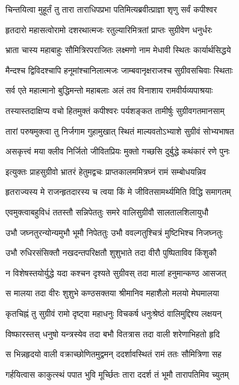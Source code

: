 \twolineshloka
{चिन्तयित्वा मुहूर्तं तु तारा ताराधिपप्रभा}
{पतिमित्यब्रवीत्प्राज्ञा शृणु सर्वं कपीश्वर}


\twolineshloka
{हृतदारो महासत्वोरामो दशरथात्मजः}
{रतुल्यारिमित्रतां प्राप्तः सुग्रीवेण धनुर्धरः}


\twolineshloka
{भ्राता चास्य महाबाहुः सौमित्रिरपराजितः}
{लक्ष्मणो नाम मेधावी स्थितः कार्यार्थसिद्धये}


\twolineshloka
{मैन्दश्च द्विविदश्चापि हनूमांश्चानिलात्मजः}
{जाम्बवानृक्षराजश्च सुग्रीवसचिवाः स्थिताः}


\twolineshloka
{सर्व एते महात्मानो बुद्धिमन्तो महाबलाः}
{अलं तव विनाशाय रामवीर्यव्यपाश्रयाः}


\twolineshloka
{तस्यास्तदाक्षिप्य वचो हितमुक्तं कपीश्वरः}
{पर्यशङ्कत तामीर्षुः सुग्रीवगतमानसाम्}


\twolineshloka
{तारां परुषमुक्त्वा तु निर्जगाम गुहामुखात्}
{स्थितं माल्यवतोऽभ्याशे सुग्रीवं सोभ्यभाषत}


\twolineshloka
{असकृत्त्वं मया क्लीव निर्जितो जीवितप्रियः}
{मुक्तो गच्छसि दुर्बुद्धे कथंकारं रणे पुनः}


\twolineshloka
{इत्युक्तः प्राहसुग्रीवो भ्रातरं हेतुमद्वचः}
{प्राप्तकालममित्रघ्नं रामं सम्बोधयन्निव}


\twolineshloka
{हृतराज्यस्य मे राजन्हृतदारस्य च त्वया}
{किं मे जीवितसामर्थ्यमिति विद्धि समागतम्}


\twolineshloka
{एवमुक्त्वाबहुविधं ततस्तौ सन्निपेततुः}
{समरे वालिसुग्रीवौ सालतालशिलायुधौ}


\twolineshloka
{उभौ जघ्नतुरन्योन्यमुभौ भूमौ निपेततुः}
{उभौ ववल्गतुश्चित्रं मुष्टिभिश्च निजघ्नतुः}


\twolineshloka
{उभौ रुधिरसंसिक्तौ नखदन्तपरिक्षतौ}
{शुशुभाते तदा वीरौ पुष्पिताविव किंशुकौ}


\twolineshloka
{न विशेषस्तयोर्युद्धे यदा कश्चन दृश्यते}
{सुग्रीवस् तदा मालां हनुमान्कण्ठ आसजत्}


\twolineshloka
{स मालया तदा वीरः शुशुभे कण्ठसक्तया}
{श्रीमानिव महाशैलो मलयो मेघमालया}


\twolineshloka
{कृतचिह्नं तु सुग्रीवं रामो दृष्ट्वा महाधनुः}
{विचकर्ष धनुःश्रेष्ठं वालिमुद्दिश्य लक्षयन्}


\twolineshloka
{विष्फारस्तस् धनुषो यन्त्रस्येव तदा बभौ}
{वितत्रास तदा वाली शरेणाभिहतो हृदि}


\twolineshloka
{स भिन्नहृदयो वाली वक्राच्छोणितमुद्वमन्}
{ददर्शावस्थितं रामं ततः सौमित्रिणा सह}


\twolineshloka
{गर्हयित्वास काकुत्स्थं पपात भुवि मूर्च्छितः}
{तारा ददर्श तं भूमौ तारापतिमिव च्युतम्}


